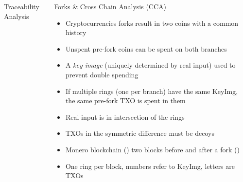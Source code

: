 \begin{columns}[t]
\begin{column}{.47\textwidth}
\begin{block}{Traceability Analysis}
\begin{itemize}
\begin{itemize}
    \end{itemize}
\end{itemize}
\end{block}
\end{column}\begin{column}{.47\textwidth}
\begin{block}{Forks \& Cross Chain Analysis (CCA)}
    \begin{itemize}
        \item Cryptocurrencies forks result in two coins with a common history
        \vspace*{0.45cm}
        \begin{center}
            
        \end{center}
        \vspace*{-0.2cm}
        \item Unspent pre-fork coins can be spent on both branches
        \item A \emph{key image} (uniquely determined by real input) used to prevent double spending
        \item If multiple rings (one per branch) have the same KeyImg, the same pre-fork TXO is spent in them
        \item Real input is in intersection of the rings
        \item TXOs in the symmetric difference must be decoys 
        \item Monero blockchain () two blocks before and after a fork ()
        \item One ring per block, numbers refer to KeyImg, letters are TXOs
        \begin{center}
            
        \end{center}
    \end{itemize}
    

\end{block}
\end{column}
\end{columns}
